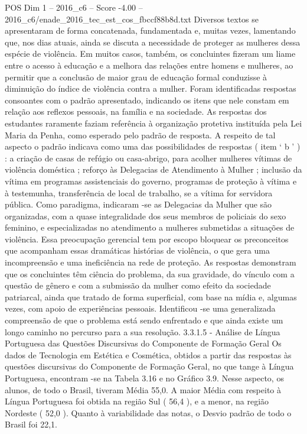 \begin{textsample}{POS Dim 1 – 2016\_c6 – Score -4.00 – 2016\_c6/enade\_2016\_tec\_est\_cos\_fbccf88b8d.txt}
Diversos textos se apresentaram de forma concatenada, fundamentada e, muitas vezes, lamentando que, nos dias atuais, ainda se discuta a necessidade de proteger as mulheres dessa espécie de violência.
Em muitos casos, também, os concluintes fizeram um liame entre o acesso à educação e a melhora das relações entre homens e mulheres, ao permitir que a conclusão de maior grau de educação formal conduzisse à diminuição do índice de violência contra a mulher.
Foram identificadas respostas consoantes com o padrão apresentado, indicando os itens que nele constam em relação aos reflexos pessoais, na família e na sociedade.
As respostas dos estudantes raramente faziam referência à organização protetiva instituída pela Lei Maria da Penha, como esperado pelo padrão de resposta.
A respeito de tal aspecto o padrão indicava como uma das possibilidades de respostas ( item ‘ b ’ ) : a criação de casas de refúgio ou casa-abrigo, para acolher mulheres vítimas de violência doméstica ; reforço às Delegacias de Atendimento à Mulher ; inclusão da vítima em programas assistenciais do governo, programas de proteção à vítima e à testemunha, transferência de local de trabalho, se a vítima for servidora pública.
Como paradigma, indicaram -se as Delegacias da Mulher que são organizadas, com a quase integralidade dos seus membros de policiais do sexo feminino, e especializadas no atendimento a mulheres submetidas a situações de violência.
Essa preocupação gerencial tem por escopo bloquear os preconceitos que acompanham essas dramáticas histórias de violência, o que gera uma incompreensão e uma ineficiência na rede de proteção.
As respostas demonstram que os concluintes têm ciência do problema, da sua gravidade, do vínculo com a questão de gênero e com a submissão da mulher como efeito da sociedade patriarcal, ainda que tratado de forma superficial, com base na mídia e, algumas vezes, com apoio de experiências pessoais.
Identificou -se uma generalizada compreensão de que o problema está sendo enfrentado e que ainda existe um longo caminho no percurso para a sua resolução. 3.3.1.5 - Análise de Língua Portuguesa das Questões Discursivas do Componente de Formação Geral Os dados de Tecnologia em Estética e Cosmética, obtidos a partir das respostas às questões discursivas do Componente de Formação Geral, no que tange à Língua Portuguesa, encontram -se na Tabela 3.16 e no Gráfico 3.9.
Nesse aspecto, os alunos, de todo o Brasil, tiveram Média 55,0.
A maior Média com respeito à Língua Portuguesa foi obtida na região Sul ( 56,4 ), e a menor, na região Nordeste ( 52,0 ).
Quanto à variabilidade das notas, o Desvio padrão de todo o Brasil foi 22,1.

\end{textsample}
